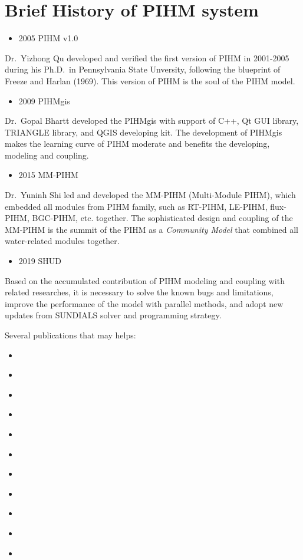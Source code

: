 \documentclass[]{scrbook}
\providecommand{\tightlist}{%
  \setlength{\itemsep}{0pt}\setlength{\parskip}{0pt}}
\begin{document}
\section{Brief History of PIHM
system}\label{brief-history-of-pihm-system}

\begin{itemize}
\tightlist
\item
  2005 PIHM v1.0
\end{itemize}

Dr.~Yizhong Qu \citep{Qu2007} developed and verified the first version
of PIHM in 2001-2005 during his Ph.D.~in Pennsylvania State Unversity,
following the blueprint of Freeze and Harlan (1969). This version of
PIHM is the soul of the PIHM model.

\begin{itemize}
\tightlist
\item
  2009 PIHMgis
\end{itemize}

Dr.~Gopal Bhartt \citep{Bhatt2012} developed the PIHMgis with support of
C++, Qt GUI library, TRIANGLE library, and QGIS developing kit. The
development of PIHMgis makes the learning curve of PIHM moderate and
benefits the developing, modeling and coupling.

\begin{itemize}
\tightlist
\item
  2015 MM-PIHM
\end{itemize}

Dr.~Yuninh Shi led and developed the MM-PIHM (Multi-Module PIHM), which
embedded all modules from PIHM family, such as RT-PIHM, LE-PIHM,
flux-PIHM, BGC-PIHM, etc. together. The sophisticated design and
coupling of the MM-PIHM is the summit of the PIHM as a \emph{Community
Model} that combined all water-related modules together.

\begin{itemize}
\tightlist
\item
  2019 SHUD
\end{itemize}

Based on the accumulated contribution of PIHM modeling and coupling with
related researches, it is necessary to solve the known bugs and
limitations, improve the performance of the model with parallel methods,
and adopt new updates from SUNDIALS solver and programming strategy.

Several publications that may helps:

\begin{itemize}
\tightlist
\item
  \citep{Qu2004}
\item
  \citep{Qu2007}
\item
  \citep{Li2008}
\item
  \citep{Kumar2004a}
\item
  \citep{Kumar2009d}
\item
  \citep{Yu2015}
\item
  \citep{Yu2014}
\item
  \citep{Li2011}
\item
  \citep{Shi2015}
\item
  \citep{Shi2015a}
\item
  \citep{Bhatt2014}
\end{itemize}
\end{document}

